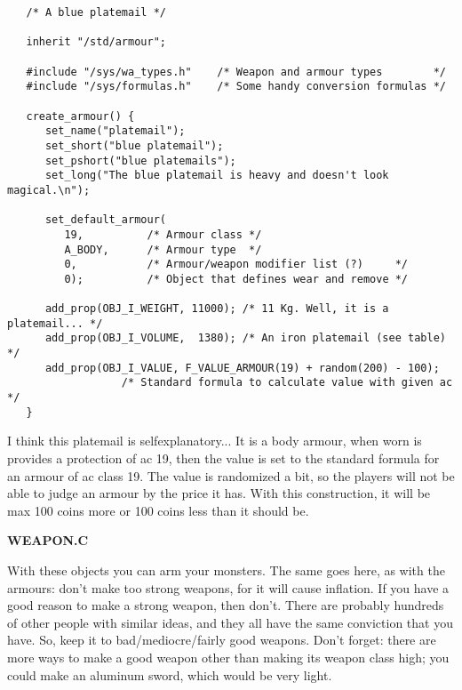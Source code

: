 \begin{verbatim}
   /* A blue platemail */

   inherit "/std/armour";

   #include "/sys/wa_types.h"    /* Weapon and armour types        */
   #include "/sys/formulas.h"    /* Some handy conversion formulas */

   create_armour() {
      set_name("platemail");
      set_short("blue platemail");
      set_pshort("blue platemails");
      set_long("The blue platemail is heavy and doesn't look magical.\n");

      set_default_armour(
         19,          /* Armour class */
         A_BODY,      /* Armour type  */
         0,           /* Armour/weapon modifier list (?)     */
         0);          /* Object that defines wear and remove */

      add_prop(OBJ_I_WEIGHT, 11000); /* 11 Kg. Well, it is a platemail... */
      add_prop(OBJ_I_VOLUME,  1380); /* An iron platemail (see table)     */
      add_prop(OBJ_I_VALUE, F_VALUE_ARMOUR(19) + random(200) - 100);
                  /* Standard formula to calculate value with given ac */
   }
\end{verbatim}

I think this platemail is selfexplanatory... It is a body armour, when worn
is provides a protection of ac 19, then the value is set to the standard
formula for an armour of ac class 19. The value is randomized a bit, so the
players will not be able to judge an armour by the price it has. With this
construction, it will be max 100 coins more or 100 coins less than it should
be.

{\bf WEAPON.C}

With these objects you can arm your monsters. The same goes here, as with
the armours: don't make too strong weapons, for it will cause inflation.
If you have a good reason to make a strong weapon, then don't. There are
probably hundreds of other people with similar ideas, and they all have
the same conviction that you have. So, keep it to bad/mediocre/fairly good
weapons. Don't forget: there are more ways to make a good weapon other than
making its weapon class high; you could make an aluminum sword, which would
be very light.

